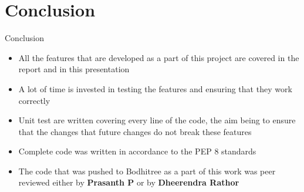 \documentclass[xcolor=table]{beamer}
\begin{document}

\section{Conclusion}

\begin{frame}{Conclusion}
	\begin{itemize}
		\item All the features that are developed as a part of this project are covered in the report and in this presentation
		\item A lot of time is invested in testing the features and ensuring that they work correctly 
		\item Unit test are written covering every line of the code, the aim being to ensure that the changes that future changes do not break these features
		\item Complete code was written in accordance to the PEP 8 standards
		\item The code that was pushed to Bodhitree as a part of this work was peer reviewed either by \textbf{Prasanth P} or by \textbf{Dheerendra Rathor}
	\end{itemize}
\end{frame}

%
%  
%  
\end{document}
